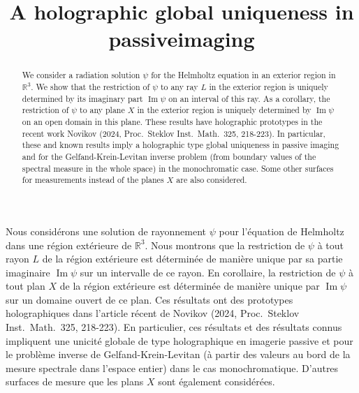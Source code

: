 \documentclass[JEP,XML,SOM,Unicode,NoEqCountersInSection,published]{cedram}
\renewcommand{\Im}{\mathop{\mathrm{Im}}}
\theoremstyle{definition}
\begin{document}
\frontmatter
\title{A holographic global uniqueness in passive\nobreakspace imaging}

\author[\initial{R.} \middlename{G.} \lastname{Novikov}]{  }
\address{CMAP, CNRS, École polytechnique,\\
Institut Polytechnique de Paris, Palaiseau, France}
\address{\& IEPT RAS, 117997 Moscow, Russia}

\begin{abstract}
We consider a radiation solution $\psi$ for the Helmholtz equation in an exterior region in $\mathbb{R}^3$. We show that the restriction of $\psi$ to any ray $L$ in the exterior region is uniquely determined by its imaginary part $\Im\psi$ on an interval of this ray. As a corollary, the restriction of $\psi$ to any plane $X$ in the exterior region is uniquely determined by $\Im\psi$ on an open domain in this plane. These results have holographic prototypes in the recent work Novikov (2024, Proc.\ Steklov Inst.\ Math.\ 325, 218-223). In particular, these and known results imply a holographic type global uniqueness in passive imaging and for the Gelfand-Krein-Levitan inverse problem (from boundary values of the spectral measure in the whole space) in the monochromatic case. Some other surfaces for measurements instead of the planes $X$ are also considered.
\end{abstract}





\begin{altabstract}
Nous considérons une solution de rayonnement $\psi$ pour l'équation de Helmholtz dans une région extérieure de $\mathbb R^3$. Nous montrons que la restriction de $\psi$ à tout rayon $L$ de la région extérieure est déterminée de manière unique par sa partie imaginaire $\Im\psi$ sur un intervalle de ce rayon. En corollaire, la restriction de $\psi$ à tout plan $X$ de la région extérieure est déterminée de manière unique par $\mathop{\mathrm{Im}}\psi$ sur un domaine ouvert de ce plan. Ces résultats ont des prototypes holographiques dans l'article récent de Novikov (2024, Proc.\ Steklov Inst.\ Math.\ 325, 218-223). En particulier, ces résultats et des résultats connus impliquent une unicité globale de type holographique en imagerie passive et pour le problème inverse de Gelfand-Krein-Levitan (à partir des valeurs au bord de la mesure spectrale dans l'espace entier) dans le cas monochromatique. D'autres surfaces de mesure que les plans $X$ sont également considérées.
\end{altabstract}
\end{document}
